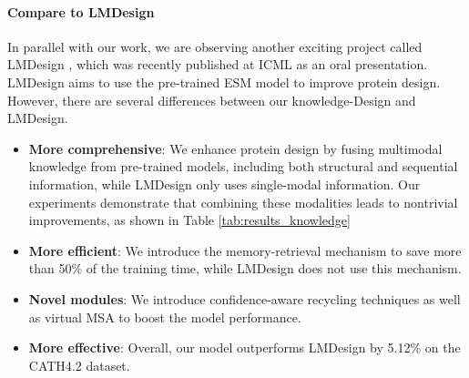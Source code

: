 \documentclass{article}
\begin{document}
\paragraph{Compare to LMDesign} In parallel with our work, we are observing another exciting project called LMDesign \citep{zheng2023structure}, which was recently published at ICML as an oral presentation. LMDesign aims to use the pre-trained ESM model to improve protein design. However, there are several differences between our knowledge-Design and LMDesign. 
\begin{itemize}
    \item \textbf{More comprehensive}: We enhance protein design by fusing multimodal knowledge from pre-trained models, including both structural and sequential information, while LMDesign only uses single-modal information. Our experiments demonstrate that combining these modalities leads to nontrivial improvements, as shown in Table \ref{tab:results_knowledge}
    \item \textbf{More efficient}: We introduce the memory-retrieval mechanism to save more than 50\% of the training time, while LMDesign does not use this mechanism.
    \item \textbf{Novel modules}: We introduce confidence-aware recycling techniques as well as virtual MSA to boost the model performance.
    \item \textbf{More effective}:  Overall, our model outperforms LMDesign by 5.12\% on the CATH4.2 dataset.
\end{itemize}
\end{document}
